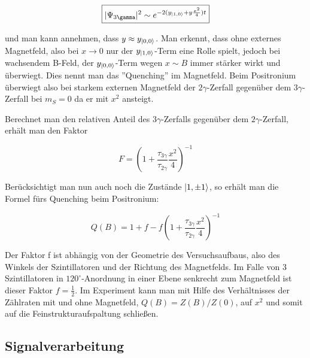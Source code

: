\begin{equation} \boxed{ |\Psi_{3\gamma}|^2 \sim e^{-2(y_{\ket{1,0}}+y\frac{x^2}{4})t} } \end{equation}

und man kann annehmen, dass $y \approx y_{\ket{0,0}}$. Man erkennt, dass ohne externes Magnetfeld, also bei $x\to 0$ nur der $y_{\ket{1,0}}$-Term eine Rolle spielt, jedoch bei wachsendem B-Feld, der $y_{\ket{0,0}}$-Term wegen $x \sim B$ immer stärker wirkt und überwiegt. Dies nennt man das ''Quenching'' im Magnetfeld. Beim Positronium überwiegt also bei starkem externen Magnetfeld der $2\gamma$-Zerfall gegenüber dem $3\gamma$-Zerfall bei $m_S = 0$ da er mit $x^2$ ansteigt.

Berechnet man den relativen Anteil des $3\gamma$-Zerfalls gegenüber dem $2\gamma$-Zerfall, erhält man den Faktor

$$ F = \left( 1+\frac{\tau_{3\gamma}}{\tau_{2\gamma}}\frac{x^2}{4}\right)^{-1} $$

Berücksichtigt man nun auch noch die Zustände $\ket{1,\pm1}$, so erhält man die Formel fürs Quenching beim Positronium:

\begin{equation} \boxed{Q(B) = 1 + f - f\left( 1+\frac{\tau_{3\gamma}}{\tau_{2\gamma}}\frac{x^2}{4}\right)^{-1}} \end{equation}

Der Faktor f ist abhängig von der Geometrie des Versuchsaufbaus, also des Winkels der Szintillatoren und der Richtung des Magnetfelds. Im Falle von 3 Szintillatoren in $120^\circ$-Anordnung in einer Ebene senkrecht zum Magnetfeld ist dieser Faktor $f=\frac{1}{2}$. Im Experiment kann man mit Hilfe des Verhältnisses der Zählraten mit und ohne Magnetfeld, $Q(B) = Z(B) / Z(0)$,  auf $x^2$ und somit auf die Feinstrukturaufspaltung schließen.

\subsection{Signalverarbeitung}

